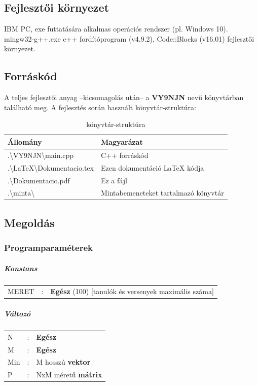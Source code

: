 \documentclass[a4paper]{article}
\begin{document}
    \subsection{Fejlesztői környezet}
    IBM PC, exe futtatására alkalmas operációs rendszer (pl. Windows 10). \\
    mingw32-g++.exe c++ fordítóprogram (v4.9.2), Code::Blocks (v16.01) fejlesztői környezet.
    \subsection{Forráskód}
    A teljes fejlesztői anyag –kicsomagolás után– a \textbf{VY9NJN} nevű könyvtárban található meg.
    A fejlesztés során használt könyvtár-struktúra:
    \begin{table}[H]
      \centering
      \caption*{könyvtár-struktúra}
      \begin{tabular}{ll}
        \toprule
        Állomány & Magyarázat \\
        \midrule
        .\textbackslash VY9NJN\textbackslash main.cpp & C++ forráskód \\
        .\textbackslash LaTeX\textbackslash Dokumentacio.tex & Ezen dokumentáció LaTeX kódja \\
        .\textbackslash Dokumentacio.pdf & Ez a fájl \\
        .\textbackslash minta\textbackslash & Mintabemeneteket tartalmazó könyvtár \\
        \bottomrule
      \end{tabular}
    \end{table}
    \subsection{Megoldás}
      \subsubsection{Programparaméterek}
        \subparagraph{Konstans}
        \begin{center}
        \begin{tabular}{lcl}
          MERET & : & \textbf{Egész} (100) [tanulók és versenyek maximális száma]  \\
        \end{tabular}
        \end{center}
        \subparagraph{Változó}
        \begin{center}
        \begin{tabular}{lcl}
          N & : & \textbf{Egész} \\
          M & : & \textbf{Egész} \\
          Min & : & M hosszú \textbf{vektor} \\
          P & : & NxM méretű \textbf{mátrix} \\
        \end{tabular}
        \end{center}
\end{document}
